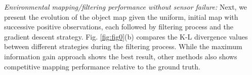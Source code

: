 \documentclass[letterpaper, 10 pt, conference]{ieeeconf}
\begin{document}
\textit{Environmental mapping/filtering performance without sensor failure:}
Next, we present the evolution of the object map given the uniform, initial map with successive positive observations, each followed by filtering process and the gradient descent strategy. 
%
%
Fig. \ref{fig:fig0}(b) compares the K-L divergence values between different strategies during the filtering process. While the maximum information gain approach shows the best result, other methods also shows competitive mapping performance relative to the ground truth.
\end{document}

